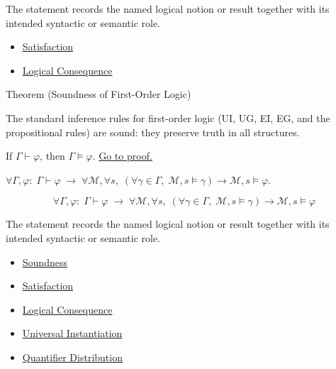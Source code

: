 \begin{remark*}[Interpretation]
The statement records the named logical notion or result together with its
intended syntactic or semantic role.
\end{remark*}


\begin{dependencies}
\begin{itemize}
  \item \hyperref[def:fol-satisfaction]{Satisfaction}
  \item \hyperref[def:log-consequence]{Logical Consequence}
\end{itemize}
\end{dependencies}

\begin{theorembox}{Theorem (Soundness of First-Order Logic)}
\begin{theorem}\label{thm:fol-sound}
The standard inference rules for first-order logic (UI, UG, EI, EG, and the
propositional rules) are sound: they preserve truth in all structures.

If $\Gamma \vdash \varphi$, then $\Gamma \models \varphi$.
\hyperref[prf:fol-sound]{Go to proof.}
\end{theorem}
\end{theorembox}
\begin{remark*}
$\forall \Gamma,\varphi:\; \Gamma\vdash\varphi \;\to\; \forall\mathcal{M},\forall s,\; (\forall\gamma\in\Gamma,\; \mathcal{M},s\models\gamma) \to \mathcal{M},s\models\varphi$.
\end{remark*}

\begin{remark*}
\[
  \forall \Gamma,\varphi:\; \Gamma\vdash\varphi \;\to\; \forall\mathcal{M},\forall s,\; (\forall\gamma\in\Gamma,\; \mathcal{M},s\models\gamma) \to \mathcal{M},s\models\varphi
\]
\end{remark*}



\begin{remark*}[Interpretation]
The statement records the named logical notion or result together with its
intended syntactic or semantic role.
\end{remark*}

\begin{dependencies}
\begin{itemize}
  \item \hyperref[def:fol-soundness]{Soundness}
  \item \hyperref[def:fol-satisfaction]{Satisfaction}
  \item \hyperref[def:log-consequence]{Logical Consequence}
  \item \hyperref[ax:predicate-logic-universal-instantiation]{Universal Instantiation}
  \item \hyperref[ax:predicate-logic-quantifier-distribution]{Quantifier Distribution}
\end{itemize}
\end{dependencies}

